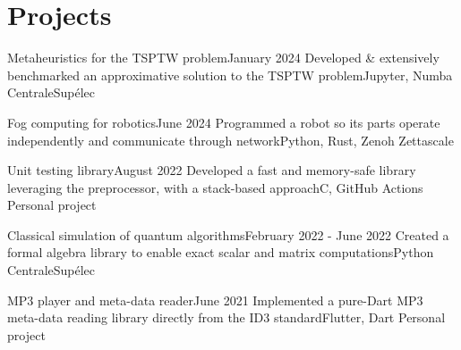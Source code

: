 \section{Projects}
\resumeSubHeadingListStart
    \resumeProjectHeading
    {Metaheuristics for the TSPTW problem}{January 2024}
    {Developed \& extensively benchmarked an approximative solution to the TSPTW problem}{Jupyter, Numba}
    {}
    {CentraleSupélec}

    \resumeProjectHeading
    {Fog computing for robotics}{June 2024}
    {Programmed a robot so its parts operate independently and communicate through network}{Python, Rust, Zenoh}
    {}
    {Zettascale}

    \resumeProjectHeading
    {Unit testing library}{\quad August 2022}
    {Developed a fast and memory-safe library leveraging the preprocessor, with a stack-based approach}{C, GitHub Actions}
    {}
    {Personal project}
    \vspace{-7pt}
    \resumeItemListStart
    \resumeItemListEnd

    \resumeProjectHeading
    {Classical simulation of quantum algorithms}{February 2022 - June 2022}
    {Created a formal algebra library to enable exact scalar and matrix computations}{Python}
    {}
    {CentraleSupélec}
    \vspace{-7pt}
    \resumeItemListStart
    \resumeItemListEnd

    \resumeProjectHeading
    {MP3 player and meta-data reader}{June 2021}
    {Implemented a pure-Dart MP3 meta-data reading library directly from the ID3 standard}{Flutter, Dart}
    {}
    {Personal project}
    \vspace{-7pt}
    \resumeItemListStart
    \resumeItemListEnd


\resumeSubHeadingListEnd
